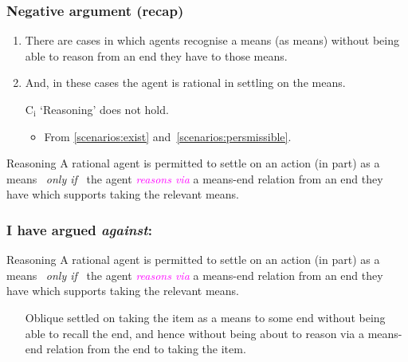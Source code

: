 \documentclass[noamssymb,
]{beamer} %
\newcommand{\hand}{\ding{43}}
\newcommand{\hozlinedash}[0]{%
  \noindent\hdashrule[0.5ex][c]{\textwidth}{.1pt}{2.5pt}
}
\begin{document}
\begin{frame}
  \frametitle{Negative argument (recap)}

  \begin{enumerate}
  \item\label{scenarios:exist} There are cases in which agents recognise a means (as means) without being able to reason from an end they have to those means.
  \item\label{scenarios:persmissible} And, in these cases the agent is rational in settling on the means.

  \item[C\(_{\text{i}}\)] `Reasoning' does not hold.
    \begin{itemize}
    \item From \ref{scenarios:exist} and~\ref{scenarios:persmissible}.
    \end{itemize}
  \end{enumerate}

  \hozlinedash
  {\footnotesize
    \begin{block}{Reasoning}
      A rational agent is permitted to settle on an action (in part) as a means
      \newline
      \mbox{ }\hfill\emph{only if}\hfill\mbox{ }
      \newline
      the agent \textcolor{fuchsia}{\emph{reasons via}}  a means-end relation from an end they have which supports taking the relevant means.
    \end{block}
  }

\end{frame}

\begin{frame}
  \frametitle{I have argued \emph{against}:}

  \begin{block}{Reasoning}
    A rational agent is permitted to settle on an action (in part) as a means
    \newline
    \mbox{ }\hfill\emph{only if}\hfill\mbox{ }
    \newline
    the agent \textcolor{fuchsia}{\emph{reasons via}} a means-end relation from an end they have which supports taking the relevant means.
  \end{block}

  \begin{itemize}
  \item[\hand] Oblique settled on taking the item as a means to some end without being able to recall the end, and hence without being about to reason via a means-end relation from the end to taking the item.
  \end{itemize}
\end{frame}
\end{document}
